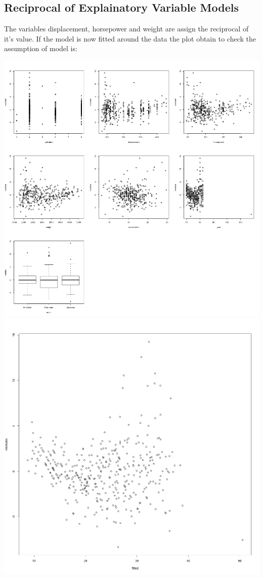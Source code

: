 \documentclass[11pt]{article} %
\begin{document}
\subsection{Reciprocal of Explainatory Variable Models}
The variables displacement, horsepower and weight are assign the reciprocal of it's value. If the model is now fitted around the data the plot obtain to check the assumption of model is:
\begin{center}
\includegraphics[scale=0.13]{2_res_vs_value}
\includegraphics[scale=0.13]{2_res_vs_fitted}
\end{center}
\end{document}
